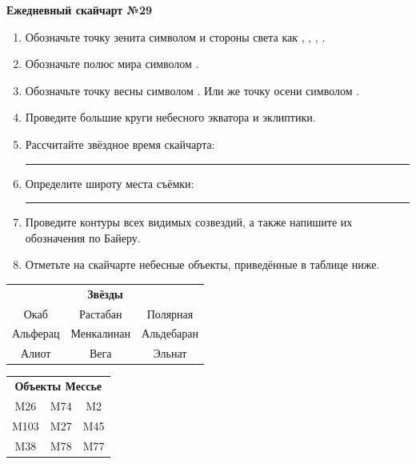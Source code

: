 \documentclass{./SAS-class-skygen}
\begin{document}
    
    
    
	\begin{center}
		\large\textbf{Ежедневный скайчарт №29}
	\end{center}

	\begin{enumerate}
		\item Обозначьте точку зенита символом  и стороны света как , , , .
		\item Обозначьте полюс мира символом .
		\item Обозначьте точку весны символом \Aries. Или же точку осени символом \Libra.
		\item Проведите большие круги небесного экватора и эклиптики.
		\item Рассчитайте звёздное время скайчарта: \rule{2cm}{0.4pt}
		\item Определите широту места съёмки: \rule{2cm}{0.4pt}
		\item Проведите контуры всех видимых созвездий, а также напишите их обозначения по Байеру.
		\item Отметьте на скайчарте небесные объекты, приведённые в таблице ниже.
	\end{enumerate}
	
    \vspace{0.5cm}

    \begin{table}[h!]
    \centering
    \begin{tabular}{ccc}
    \multicolumn{3}{c}{\textbf{Звёзды}} \\ Окаб & Растабан & Полярная \\
Альферац & Менкалинан & Альдебаран \\
Алиот & Вега & Эльнат \\

\end{tabular}
    \hfill
    \begin{tabular}{ccc}
    \multicolumn{3}{c}{\textbf{Объекты Мессье}} \\ M26 & M74 & M2 \\
M103 & M27 & M45 \\
M38 & M78 & M77 \\

\end{tabular}
    \end{table}
	
\end{document}
